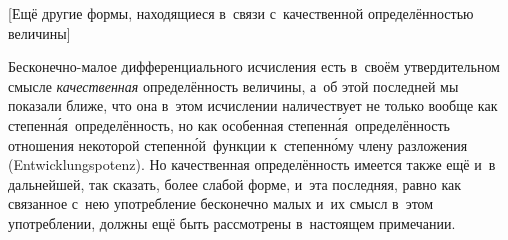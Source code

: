 \bigskip

%
{[Ещё другие формы, находящиеся в~связи с~качественной
определённостью величины]}

\label{bkm:bm53a}
Бесконечно-малое дифференциального исчисления есть в~своём утвердительном
смысле {\em качественная} определённость величины, а~об этой последней мы
показали ближе, что она в~этом исчислении наличествует не только вообще как
степенн\'{а}я~определённость, но как особенная степенн\'{а}я~определённость
отношения некоторой степенн\'{о}й~функции к~степенн\'{о}му члену разложения
(Ent\-wick\-lungs\-potenz). Но качественная
определённость имеется также ещё и~в дальнейшей, так сказать, более слабой
форме, и~эта последняя, равно как связанное с~нею употребление бесконечно малых
и~их смысл в~этом употреблении, должны ещё быть рассмотрены в~настоящем
примечании.

